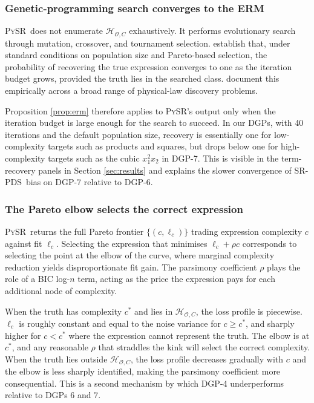 \documentclass[11pt, a4paper]{article}
\theoremstyle{plain}
\theoremstyle{definition}
\theoremstyle{remark}
\newcommand{\pysr}{\textsc{PySR}}
\newcommand{\epds}{\textsc{SR-PDS}}
\newcommand{\Hcal}{\mathcal{H}_{\mathcal{O}, C}}
\begin{document}
\subsubsection{Genetic-programming search converges to the ERM}

\pysr\ does not enumerate $\Hcal$ exhaustively. It performs
evolutionary search through mutation, crossover, and tournament
selection. \citet{schmidt2009gp} establish that, under standard
conditions on population size and Pareto-based selection, the
probability of recovering the true expression converges to one
as the iteration budget grows, provided the truth lies in the
searched class. \citet{cranmer2023pysr} document this
empirically across a broad range of physical-law discovery
problems.

Proposition \ref{prop:erm} therefore applies to \pysr's output
only when the iteration budget is large enough for the search
to succeed. In our DGPs, with 40 iterations and the default
population size, recovery is essentially one for low-complexity
targets such as products and squares, but drops below one for
high-complexity targets such as the cubic $x_1^2 x_2$ in
DGP-7. This is visible in the term-recovery panels in Section
\ref{sec:results} and explains the slower convergence of \epds\
bias on DGP-7 relative to DGP-6.

\subsubsection{The Pareto elbow selects the correct expression}

\pysr\ returns the full Pareto frontier $\{(c, \ell_c)\}$
trading expression complexity $c$ against fit $\ell_c$.
Selecting the expression that minimises $\ell_c + \rho c$
corresponds to selecting the point at the elbow of the curve,
where marginal complexity reduction yields disproportionate fit
gain. The parsimony coefficient $\rho$ plays the role of a BIC
log-$n$ term, acting as the price the expression pays for each
additional node of complexity.

When the truth has complexity $c^*$ and lies in $\Hcal$, the
loss profile is piecewise. $\ell_c$ is roughly constant and
equal to the noise variance for $c \geq c^*$, and sharply
higher for $c < c^*$ where the expression cannot represent the
truth. The elbow is at $c^*$, and any reasonable $\rho$ that
straddles the kink will select the correct complexity. When the
truth lies outside $\Hcal$, the loss profile decreases
gradually with $c$ and the elbow is less sharply identified,
making the parsimony coefficient more consequential. This is a
second mechanism by which DGP-4 underperforms relative to DGPs
6 and 7.
\end{document}
